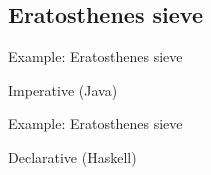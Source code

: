 \documentclass[10pt, compress, xcolor=table]{beamer}
\begin{document}
\subsection{Eratosthenes sieve}

\begin{frame}{Example: Eratosthenes sieve}
    \begin{block}{Imperative (Java)}
        \makejavasieve
    \end{block}
\end{frame}

\begin{frame}{Example: Eratosthenes sieve}
    \begin{block}{Declarative (Haskell)}
        \makehaskellsieve
    \end{block}
\end{frame}
\end{document}
